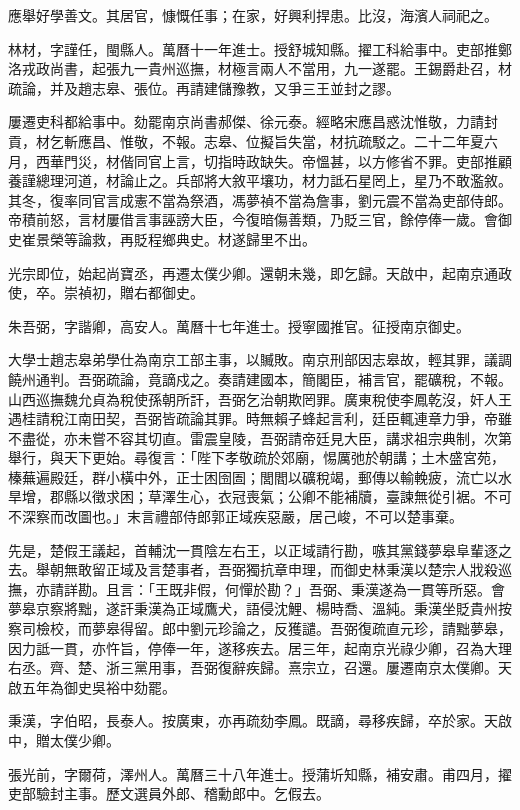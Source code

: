 \begin{pinyinscope}
應舉好學善文。其居官，慷慨任事；在家，好興利捍患。比沒，海濱人祠祀之。

林材，字謹任，閩縣人。萬曆十一年進士。授舒城知縣。擢工科給事中。吏部推鄭洛戎政尚書，起張九一貴州巡撫，材極言兩人不當用，九一遂罷。王錫爵赴召，材疏論，并及趙志皋、張位。再請建儲豫教，又爭三王並封之謬。

屢遷吏科都給事中。劾罷南京尚書郝傑、徐元泰。經略宋應昌惑沈惟敬，力請封貢，材乞斬應昌、惟敬，不報。志皋、位擬旨失當，材抗疏駁之。二十二年夏六月，西華門災，材偕同官上言，切指時政缺失。帝慍甚，以方修省不罪。吏部推顧養謹總理河道，材論止之。兵部將大敘平壤功，材力詆石星罔上，星乃不敢濫敘。其冬，復率同官言成憲不當為祭酒，馮夢禎不當為詹事，劉元震不當為吏部侍郎。帝積前怒，言材屢借言事誣謗大臣，今復暗傷善類，乃貶三官，餘停俸一歲。會御史崔景榮等論救，再貶程鄉典史。材遂歸里不出。

光宗即位，始起尚寶丞，再遷太僕少卿。還朝未幾，即乞歸。天啟中，起南京通政使，卒。崇禎初，贈右都御史。

朱吾弼，字諧卿，高安人。萬曆十七年進士。授寧國推官。征授南京御史。

大學士趙志皋弟學仕為南京工部主事，以贓敗。南京刑部因志皋故，輕其罪，議調饒州通判。吾弼疏論，竟謫戍之。奏請建國本，簡閣臣，補言官，罷礦稅，不報。山西巡撫魏允貞為稅使孫朝所訐，吾弼乞治朝欺罔罪。廣東稅使李鳳乾沒，奸人王遇桂請稅江南田契，吾弼皆疏論其罪。時無賴子蜂起言利，廷臣輒連章力爭，帝雖不盡從，亦未嘗不容其切直。雷震皇陵，吾弼請帝廷見大臣，講求祖宗典制，次第舉行，與天下更始。尋復言：「陛下孝敬疏於郊廟，惕厲弛於朝講；土木盛宮苑，榛蕪遍殿廷，群小橫中外，正士困囹圄；閭閻以礦稅竭，郵傳以輸輓疲，流亡以水旱增，郡縣以徵求困；草澤生心，衣冠喪氣；公卿不能補牘，臺諫無從引裾。不可不深察而改圖也。」末言禮部侍郎郭正域疾惡嚴，居己峻，不可以楚事棄。

先是，楚假王議起，首輔沈一貫陰左右王，以正域請行勘，嗾其黨錢夢皋阜輩逐之去。舉朝無敢留正域及言楚事者，吾弼獨抗章申理，而御史林秉漢以楚宗人戕殺巡撫，亦請詳勘。且言：「王既非假，何憚於勘？」吾弼、秉漢遂為一貫等所惡。會夢皋京察將黜，遂訐秉漢為正域鷹犬，語侵沈鯉、楊時喬、溫純。秉漢坐貶貴州按察司檢校，而夢皋得留。郎中劉元珍論之，反獲譴。吾弼復疏直元珍，請黜夢皋，因力詆一貫，亦忤旨，停俸一年，遂移疾去。居三年，起南京光祿少卿，召為大理右丞。齊、楚、浙三黨用事，吾弼復辭疾歸。熹宗立，召還。屢遷南京太僕卿。天啟五年為御史吳裕中劾罷。

秉漢，字伯昭，長泰人。按廣東，亦再疏劾李鳳。既謫，尋移疾歸，卒於家。天啟中，贈太僕少卿。

張光前，字爾荷，澤州人。萬曆三十八年進士。授蒲圻知縣，補安肅。甫四月，擢吏部驗封主事。歷文選員外郎、稽勳郎中。乞假去。


\end{pinyinscope}
